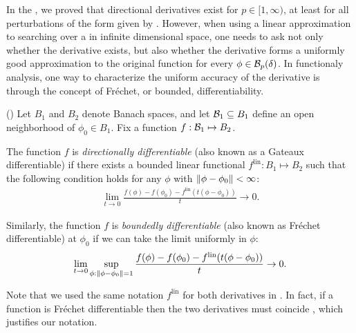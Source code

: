 
In the , we proved that directional derivatives exist for
$p \in [1, \infty)$, at least for all perturbations of the form given by
. However, when using a linear approximation to searching
over a in infinite dimensional space, one needs to ask not only whether the
derivative exists, but also whether the derivative forms a uniformly good
approximation to the original function for every $\phi \in \mathcal{B}_p(\delta)$. In
functionaly analysis, one way to characterize the uniform accuracy of the
derivative is through the concept of Fr{\'e}chet, or bounded, differentiability.

\begin{defn}
    (\citep[Definition 4.5]{zeidler:2013:functional})
%
Let $B_1$ and $B_2$ denote Banach spaces, and let $\mathcal{B}_1 \subseteq B_1$ define
an open neighborhood of $\phi_0 \in B_1$.  Fix a function $f: \mathcal{B}_1
\mapsto B_2$.

The function $f$ is {\em directionally differentiable} (also known as a Gateaux
differentiable) if there exists a bounded linear functional $f^{\mathrm{lin}}:
B_1 \mapsto B_2$ such that the following condition holds for any
$\phi$ with $\left\Vert\phi - \phi_0\right\Vert < \infty$:
%
\begin{align*}
%
\lim_{t \rightarrow 0}
    \frac{f(\phi) - f(\phi_0) -
          f^{\mathrm{lin}}(t (\phi - \phi_0) )
         }{t} \rightarrow 0.
%
\end{align*}
%

Similarly, the function $f$ is {\em boundedly differentiable} (also known as
Fr{\'echet} differentiable) at $\phi_0$ if we can take the limit uniformly in
$\phi$:
%
\begin{align*}
%
\lim_{t \rightarrow 0}
    \sup_{\phi: \norm{\phi - \phi_0} = 1}
    \frac{f(\phi) - f(\phi_0) -
          f^{\mathrm{lin}}(t (\phi - \phi_0))
         }{t} \rightarrow 0.
%
\end{align*}
%
\end{defn}

Note that we used the same notation $f^{\mathrm{lin}}$ for both derivatives in
.  In fact, if a function is Fr{\'e}chet differentiable
then the two derivatives must coincide \citep[Proposition
4.8]{zeidler:2013:functional}, which justifies our notation.

